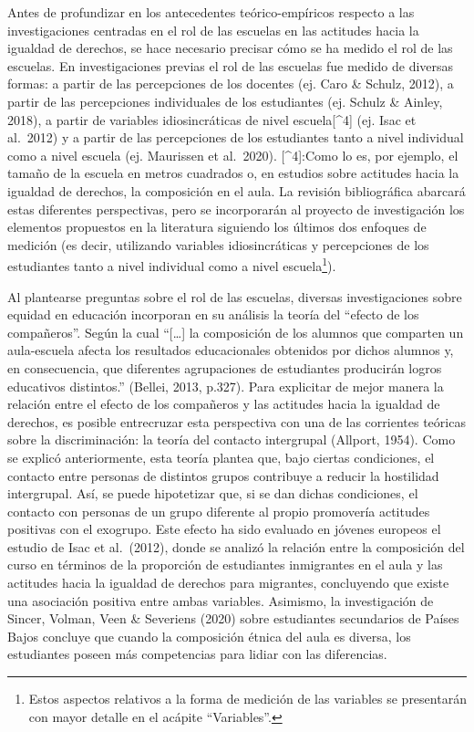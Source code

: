 \documentclass[12pt,twoside]{templates/facsothesis}
\begin{document}
Antes de profundizar en los antecedentes teórico-empíricos respecto a las investigaciones centradas en el rol de las escuelas en las actitudes hacia la igualdad de derechos, se hace necesario precisar cómo se ha medido el rol de las escuelas. En investigaciones previas el rol de las escuelas fue medido de diversas formas: a partir de las percepciones de los docentes (ej. Caro \& Schulz, 2012), a partir de las percepciones individuales de los estudiantes (ej. Schulz \& Ainley, 2018), a partir de variables idiosincráticas de nivel escuela{[}\^{}4{]} (ej. Isac et al.~2012) y a partir de las percepciones de los estudiantes tanto a nivel individual como a nivel escuela (ej. Maurissen et al.~2020). {[}\^{}4{]}:Como lo es, por ejemplo, el tamaño de la escuela en metros cuadrados o, en estudios sobre actitudes hacia la igualdad de derechos, la composición en el aula. La revisión bibliográfica abarcará estas diferentes perspectivas, pero se incorporarán al proyecto de investigación los elementos propuestos en la literatura siguiendo los últimos dos enfoques de medición (es decir, utilizando variables idiosincráticas y percepciones de los estudiantes tanto a nivel individual como a nivel escuela\footnote{Estos aspectos relativos a la forma de medición de las variables se presentarán con mayor detalle en el acápite ``Variables''.}).

Al plantearse preguntas sobre el rol de las escuelas, diversas investigaciones sobre equidad en educación incorporan en su análisis la teoría del ``efecto de los compañeros''. Según la cual ``{[}\ldots{]} la composición de los alumnos que comparten un aula-escuela afecta los resultados educacionales obtenidos por dichos alumnos y, en consecuencia, que diferentes agrupaciones de estudiantes producirán logros educativos distintos.'' (Bellei, 2013, p.327). Para explicitar de mejor manera la relación entre el efecto de los compañeros y las actitudes hacia la igualdad de derechos, es posible entrecruzar esta perspectiva con una de las corrientes teóricas sobre la discriminación: la teoría del contacto intergrupal (Allport, 1954). Como se explicó anteriormente, esta teoría plantea que, bajo ciertas condiciones, el contacto entre personas de distintos grupos contribuye a reducir la hostilidad intergrupal. Así, se puede hipotetizar que, si se dan dichas condiciones, el contacto con personas de un grupo diferente al propio promovería actitudes positivas con el exogrupo. Este efecto ha sido evaluado en jóvenes europeos el estudio de Isac et al.~(2012), donde se analizó la relación entre la composición del curso en términos de la proporción de estudiantes inmigrantes en el aula y las actitudes hacia la igualdad de derechos para migrantes, concluyendo que existe una asociación positiva entre ambas variables. Asimismo, la investigación de Sincer, Volman, Veen \& Severiens (2020) sobre estudiantes secundarios de Países Bajos concluye que cuando la composición étnica del aula es diversa, los estudiantes poseen más competencias para lidiar con las diferencias.
\end{document}
